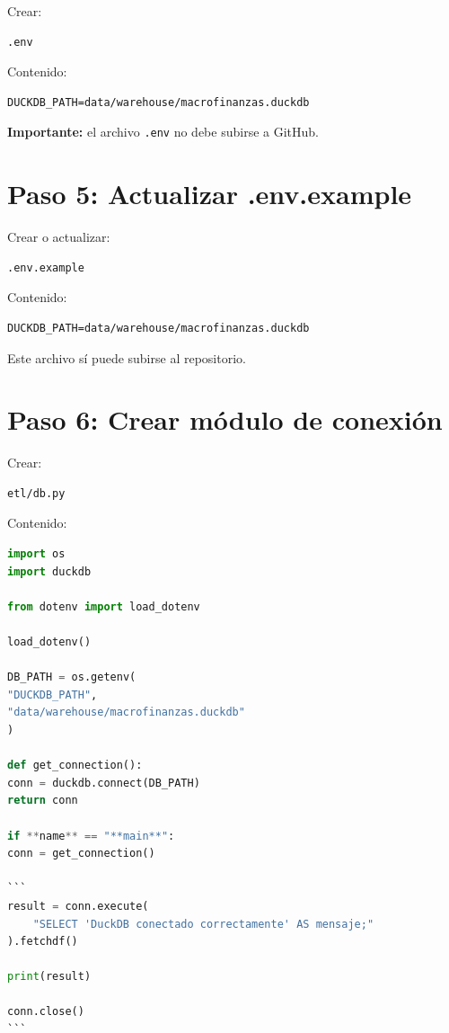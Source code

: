 Crear:

\begin{verbatim}
.env
\end{verbatim}

Contenido:

\begin{lstlisting}
DUCKDB_PATH=data/warehouse/macrofinanzas.duckdb
\end{lstlisting}

\textbf{Importante:} el archivo \texttt{.env} no debe subirse a GitHub.

\section{Paso 5: Actualizar .env.example}

Crear o actualizar:

\begin{verbatim}
.env.example
\end{verbatim}

Contenido:

\begin{lstlisting}
DUCKDB_PATH=data/warehouse/macrofinanzas.duckdb
\end{lstlisting}

Este archivo sí puede subirse al repositorio.

\section{Paso 6: Crear módulo de conexión}

Crear:

\begin{verbatim}
etl/db.py
\end{verbatim}

Contenido:

\begin{lstlisting}[language=Python]
import os
import duckdb

from dotenv import load_dotenv

load_dotenv()

DB_PATH = os.getenv(
"DUCKDB_PATH",
"data/warehouse/macrofinanzas.duckdb"
)

def get_connection():
conn = duckdb.connect(DB_PATH)
return conn

if **name** == "**main**":
conn = get_connection()

```
result = conn.execute(
    "SELECT 'DuckDB conectado correctamente' AS mensaje;"
).fetchdf()

print(result)

conn.close()
```

\end{lstlisting}

